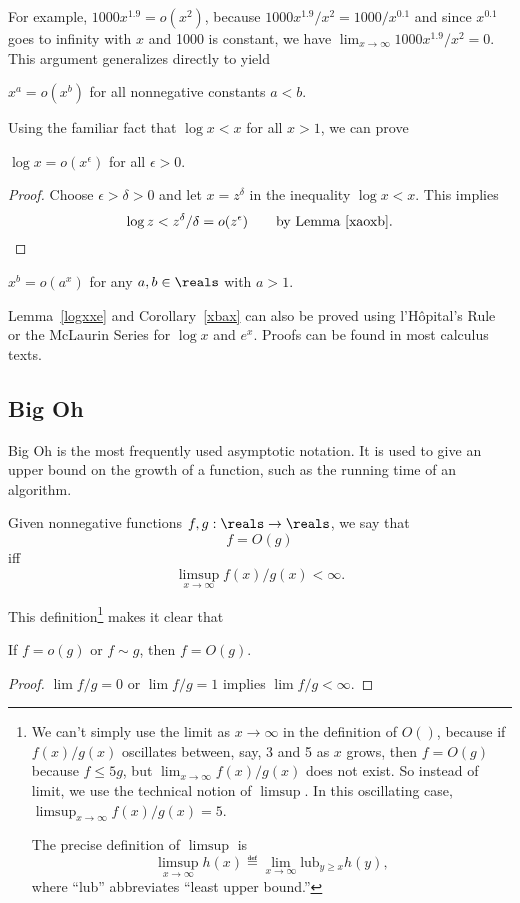 For example, $1000x^{1.9} = o(x^2)$, because $1000x^{1.9}/x^2 =
1000/x^{0.1}$ and since $x^{0.1}$ goes to infinity with $x$ and 1000 is
constant, we have $\lim_{x \rightarrow \infty} 1000x^{1.9}/x^2 = 0$.
This argument generalizes directly to yield
\begin{lemma}\label{xaoxb}
$x^a = o(x^b)$ for all nonnegative constants $a<b$.
\end{lemma}

Using the familiar fact that  $\log x < x$ for all $x >1$, we can prove
\begin{lemma}\label{logxxe}
$\log x = o(x^{\epsilon})$ for all $\epsilon >0$.
\end{lemma}

\begin{proof}
Choose $\epsilon > \delta > 0$ and let $x = z^\delta$ in the inequality
$\log x < x$.  This implies
\begin{equation}\label{zdd}
\log z  <  z^{\delta}/\delta
 =  o(z^{\epsilon})\qquad \text{by Lemma~\ref{xaoxb}}.
\end{equation}
\end{proof}

\begin{corollary}\label{xbax}
$x^b = o(a^x)$ for any $a,b \in \reals$ with $a>1$.
\end{corollary}

Lemma~\ref{logxxe} and Corollary~\ref{xbax} can also be proved using
l'H\^opital's Rule or the McLaurin Series for $\log x$ and $e^x$.
Proofs can be found in most calculus texts.

\subsection{Big Oh}

Big Oh is the most frequently used asymptotic notation.  It is used to
give an upper bound on the growth of a function, such as the running
time of an algorithm.
\begin{definition}
Given nonnegative functions $f, g : \reals \to \reals$, we
say that
\[
f = O(g)
\]
iff
\[
\limsup_{x \rightarrow \infty} f(x)/g(x) < \infty.
\]
\end{definition}
This definition\footnote{We can't simply use the limit as
$x \rightarrow \infty$ in the definition of $O()$, because if
$f(x)/g(x)$ oscillates between, say, 3 and 5 as $x$ grows, then $f =
O(g)$ because $f
\leq 5g$, but $\lim_{x \rightarrow \infty} f(x)/g(x)$ does not exist.
So instead of limit, we use the technical notion of $\limsup$.  In
this oscillating case, $\limsup_{x \rightarrow \infty} f(x)/g(x) = 5$.

The precise definition of $\limsup$ is
\[
\limsup_{x \rightarrow \infty} h(x) \eqdef \lim_{x \rightarrow \infty}
\text{lub}_{y \geq x} h(y),
\]
where ``lub'' abbreviates ``least upper bound.''} makes it clear that
\begin{lemma}\label{osimO}
If $f = o(g)$ or $f \sim g$, then $f = O(g)$.
\end{lemma}
\begin{proof}
$\lim f/g=0$ or $\lim f/g=1$ implies $\lim f/g<\infty$.
\end{proof}

